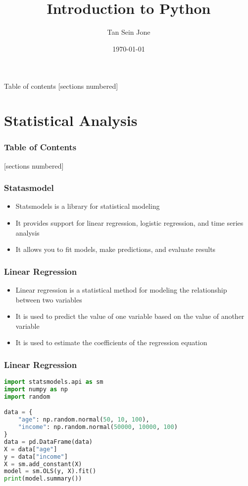 \documentclass[serif, 9pt, aspectratio=32]{beamer}
\title{Introduction to Python}
\date{\today}
\author{Tan Sein Jone}
\institute{University of British Columbia}
\begin{document}
\maketitle

\begin{frame}{Table of contents}
    [sections numbered]
    \tableofcontents[hideallsubsections]
\end{frame}

\section{Statistical Analysis}

\begin{frame}
    \frametitle{Table of Contents}
    [sections numbered]
    \tableofcontents[currentsection]
\end{frame}

\begin{frame}
    \centering
    \frametitle{Statasmodel}
    \begin{itemize}
        \setlength{\itemsep}{2em}
        \item Statsmodels is a library for statistical modeling
        \item It provides support for linear regression, logistic regression, and time series analysis
        \item It allows you to fit models, make predictions, and evaluate results
    \end{itemize}
\end{frame}

\begin{frame}
    \centering
    \frametitle{Linear Regression}
    \begin{itemize}
        \setlength{\itemsep}{2em}
        \item Linear regression is a statistical method for modeling the relationship between two variables
        \item It is used to predict the value of one variable based on the value of another variable
        \item It is used to estimate the coefficients of the regression equation
    \end{itemize}
\end{frame}

\begin{frame}[fragile]
    \frametitle{Linear Regression}
    \begin{lstlisting}[language=Python]
import statsmodels.api as sm
import numpy as np
import random

data = {
    "age": np.random.normal(50, 10, 100),
    "income": np.random.normal(50000, 10000, 100)
}
data = pd.DataFrame(data)
X = data["age"]
y = data["income"]
X = sm.add_constant(X)
model = sm.OLS(y, X).fit()
print(model.summary())
    \end{lstlisting}
\end{frame}
\end{document}
